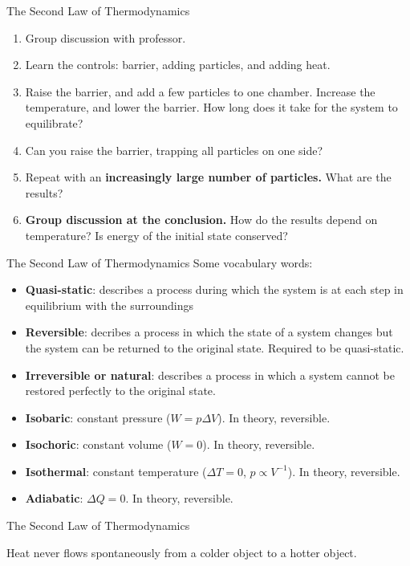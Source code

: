 \documentclass{beamer}
\begin{document}
\begin{frame}{The Second Law of Thermodynamics}
\small
\begin{enumerate}
\item Group discussion with professor.
\item Learn the controls: barrier, adding particles, and adding heat.
\item Raise the barrier, and add a few particles to one chamber.  Increase the temperature, and lower the barrier.  How long does it take for the system to equilibrate?
\item Can you raise the barrier, trapping all particles on one side?
\item Repeat with an \textbf{increasingly large number of particles.}  What are the results?
\item \textbf{Group discussion at the conclusion.}  How do the results depend on temperature?  Is energy of the initial state conserved?
\end{enumerate}
\end{frame}

\begin{frame}{The Second Law of Thermodynamics}
\small
Some vocabulary words:
\begin{itemize}
\item \textbf{Quasi-static}: describes a process during which the system is at each step in equilibrium with the surroundings
\item \textbf{Reversible}: decribes a process in which the state of a system changes but the system can be returned to the original state.  Required to be quasi-static.
\item \textbf{Irreversible or natural}: describes a process in which a system cannot be restored perfectly to the original state.
\item \textbf{Isobaric}: constant pressure ($W=p\Delta V$).  In theory, reversible.
\item \textbf{Isochoric}: constant volume ($W=0$).  In theory, reversible.
\item \textbf{Isothermal}: constant temperature ($\Delta T = 0$, $p \propto V^{-1}$).  In theory, reversible.
\item \textbf{Adiabatic}: $\Delta Q = 0$.  In theory, reversible.
\end{itemize}
\end{frame}

\begin{frame}{The Second Law of Thermodynamics}
\begin{tcolorbox}[colback=white,colframe=red!40!blue,title=The \textit{Clausius Statement} of the Second Law of Thermodynamics]
\alert{Heat never flows spontaneously from a colder object to a hotter object.}
\end{tcolorbox}
\end{frame}
\end{document}
